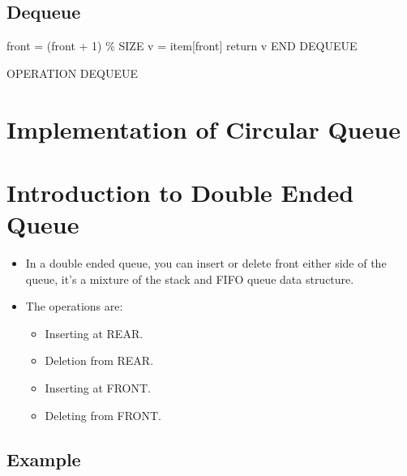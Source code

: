 \subsection{Dequeue}
\begin{center}
    \begin{algorithm}[H]
        \SetAlgoLined
        \large
        front = (front + 1) \% SIZE\; 
        v = item[front]\; 
        return v\; 
        END DEQUEUE\; 
        \caption{OPERATION DEQUEUE}
    \end{algorithm}
\end{center}


\section{Implementation of Circular Queue}


\section{Introduction to Double Ended Queue}
\begin{itemize}
    \item In a double ended queue, you can insert or delete front either side of the queue, it's a mixture of the stack and FIFO queue data structure. 
    \item The operations are:
        \begin{itemize}
            \item Inserting at REAR.
            \item Deletion from REAR.
            \item Inserting at FRONT.
            \item Deleting from FRONT. 
        \end{itemize}
\end{itemize}

\subsection{Example}



